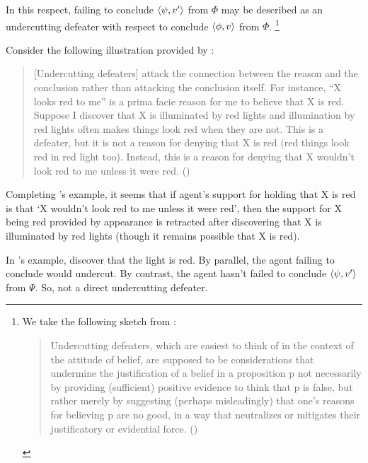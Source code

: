 \begin{note}
  In this respect, failing to conclude \(\langle \psi, v' \rangle\) from \(\Phi\) may be described as an undercutting defeater with respect to conclude \(\langle \phi, v \rangle\) from \(\Phi\).%
  \footnote{
    We take the following sketch from \textcite{Worsnip:2018aa}:
  \begin{quote}
    Undercutting defeaters, which are easiest to think of in the context of the attitude of belief, are supposed to be considerations that undermine the justification of a belief in a proposition p not necessarily by providing (sufficient) positive evidence to think that p is false, but rather merely by suggesting (perhaps misleadingly) that one’s reasons for believing p are no good, in a way that neutralizes or mitigates their justificatory or evidential force.%
    \mbox{}\hfill\mbox{(\citeyear[29]{Worsnip:2018aa})}
  \end{quote}
  }

  Consider the following illustration provided by \citeauthor{Pollock:1987un}:
  \begin{quote}
    [Undercutting defeaters] attack the connection between the reason and the conclusion rather than attacking the conclusion itself.
    For instance, ``X looks red to me'' is a prima facie reason for me to believe that X is red.
    Suppose I discover that X is illuminated by red lights and illumination by red lights often makes things look red when they are not.
    This is a defeater, but it is not a reason for denying that X is red (red things look red in red light too).
    Instead, this is a reason for denying that X wouldn't look red to me unless it were red.%
    \mbox{}\hfill\mbox{(\citeyear[485]{Pollock:1987un})}
  \end{quote}
  Completing \citeauthor{Pollock:1987un}'s example, it seems that if agent's support for holding that X is red is that `X wouldn't look red to me unless it were red', then the support for X being red provided by appearance is retracted after discovering that X is illuminated by red lights (though it remains possible that X is red).
\end{note}

\begin{note}
  In \citeauthor{Pollock:1987un}'s example, discover that the light is red.
  By parallel, the agent failing to conclude would undercut.
  By contrast, the agent hasn't failed to conclude \(\langle \psi, v' \rangle\) from \(\Psi\).
  So, not a direct undercutting defeater.
\end{note}

